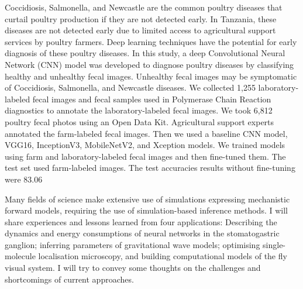 \documentclass[a4paper,UKenglish]{dagrep-v2021}
\begin{document}
Coccidiosis, Salmonella, and Newcastle are the common poultry diseases that curtail poultry production if they are not detected early. In Tanzania, these diseases are not detected early due to limited access to agricultural support services by poultry farmers. Deep learning techniques have the potential for early diagnosis of these poultry diseases. In this study, a deep Convolutional Neural Network (CNN) model was developed to diagnose poultry diseases by classifying healthy and unhealthy fecal images. Unhealthy fecal images may be symptomatic of Coccidiosis, Salmonella, and Newcastle diseases. We collected 1,255 laboratory-labeled fecal images and fecal samples used in Polymerase Chain Reaction diagnostics to annotate the laboratory-labeled fecal images. We took 6,812 poultry fecal photos using an Open Data Kit. Agricultural support experts annotated the farm-labeled fecal images. Then we used a baseline CNN model, VGG16, InceptionV3, MobileNetV2, and Xception models. We trained models using farm and laboratory-labeled fecal images and then fine-tuned them. The test set used farm-labeled images. The test accuracies results without fine-tuning were 83.06%

\license

Many fields of science make extensive use of simulations expressing mechanistic forward models, requiring the use of simulation-based inference methods. I will share experiences and lessons learned from four applications: Describing the dynamics and energy consumptions of neural networks in the stomatogastric ganglion; inferring parameters of gravitational wave models; optimising single-molecule localisation microscopy, and building computational models of the fly visual system. I will try to convey some thoughts on the challenges and shortcomings of current approaches.
\end{document}
